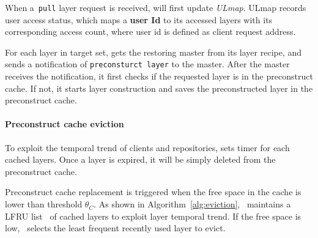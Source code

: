 When a~\texttt{pull} layer request is received, 
\sysname will first update \emph{ULmap}. 
ULmap records user access status,
which maps a \textbf{user Id} to its accessed layers with its corresponding access count,
where user id is defined as client request address.

For each layer in target set, 
\sysname gets the restoring master from its layer recipe,
and sends a notification of \texttt{preconsturct layer} to the master.
After the master receives the notification,
it first checks if the requested layer is in the preconstruct cache.
If not, 
it starts layer construction and saves the preconstructed layer in the preconstruct cache.
 
%
\paragraph{Preconstruct cache eviction}
To exploit the temporal trend of clients and repositories, 
\sysname sets timer for each cached layers.
Once a layer is expired,
it will be simply deleted from the preconstruct cache.

Preconstruct cache replacement is triggered when the free space in the cache is
lower than threshold $\theta_{C}$.
As shown in Algorithm~\ref{alg:eviction}, 
\sysname~maintains a LFRU list~\cite{xxx} of cached layers to exploit 
layer temporal trend.
If the free space is low,
\sysname~selects the least frequent recently used layer to evict.




%





